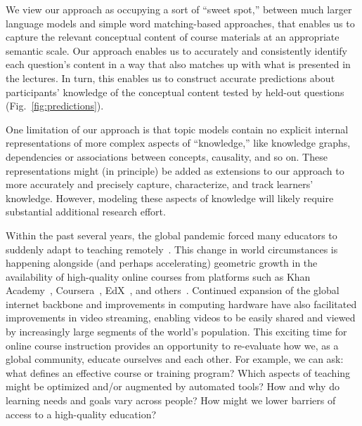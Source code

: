 \documentclass[10pt]{article}
\begin{document}
We view our approach as occupying a sort of ``sweet spot,'' between much larger
language models and simple word matching-based approaches, that enables us to
capture the relevant conceptual content of course materials at an appropriate
semantic scale. Our approach enables us to accurately and consistently identify
each question's content in a way that also matches up with what is presented in
the lectures. In turn, this enables us to construct accurate predictions about
participants' knowledge of the conceptual content tested by held-out questions
(Fig.~\ref{fig:predictions}).

One limitation of our approach is that topic models contain no explicit
internal representations of more complex aspects of ``knowledge,'' like
knowledge graphs, dependencies or associations between concepts, causality, and
so on. These representations might (in principle) be added as extensions to our
approach to more accurately and precisely capture, characterize, and track
learners' knowledge. However, modeling these aspects of knowledge will likely
require substantial additional research effort.

Within the past several years, the global pandemic forced many educators to
suddenly adapt to teaching remotely~\citep{MoseEtal21, ShimLee20, KawaEtal21,
Whal20}. This change in world circumstances is happening alongside (and perhaps
accelerating) geometric growth in the availability of high-quality online
courses from platforms such as Khan Academy~\citep{Khan04},
Coursera~\citep{Youn12}, EdX~\citep{Kolo13}, and others~\citep{RhoaEtal13}.
Continued expansion of the global internet backbone and improvements in
computing hardware have also facilitated improvements in video streaming,
enabling videos to be easily shared and viewed by increasingly large segments
of the world's population. This exciting time for online course instruction
provides an opportunity to re-evaluate how we, as a global community, educate
ourselves and each other. For example, we can ask: what defines an effective
course or training program? Which aspects of teaching might be optimized and/or
augmented by automated tools? How and why do learning needs and goals vary
across people? How might we lower barriers of access to a high-quality
education?
\end{document}
